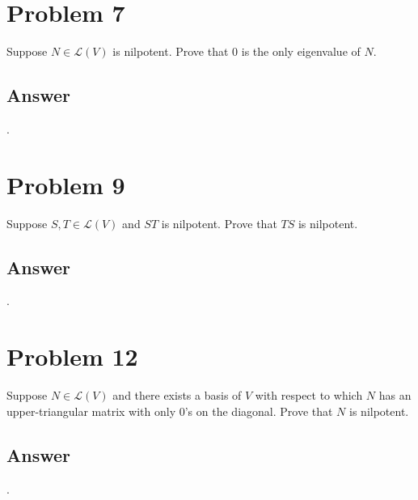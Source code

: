 \documentclass[
	12pt, %
]{fphw}
\newcommand\0{\mathbf{0}}
\renewcommand\L[1]{\mathcal{L}(#1)}
\begin{document}
\section*{Problem 7}
\begin{problem}
Suppose $N \in \L V$ is nilpotent. Prove that $0$ is the only eigenvalue
of $N$.
\end{problem}

\subsection*{Answer} .

\newpage
\section*{Problem 9}
\begin{problem}
Suppose $S, T \in \L V$ and $S T$ is nilpotent. Prove that $T S$ is nilpotent.
\end{problem}
\subsection*{Answer} .


\newpage
\section*{Problem 12}
\begin{problem}
Suppose $N \in \L V$ and there exists a basis of $V$ with respect to which
$N$ has an upper-triangular matrix with only $0$’s on the diagonal. Prove
that $N$ is nilpotent.
\end{problem}
\subsection*{Answer} .
\end{document}
